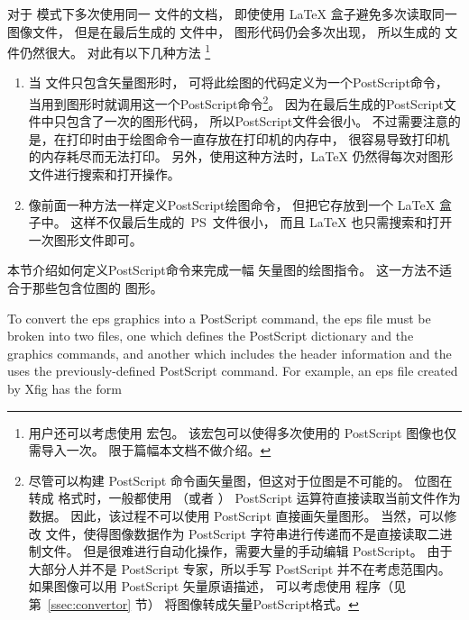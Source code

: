 对于  模式下多次使用同一  文件的文档，
即使使用 \LaTeX{} 盒子避免多次读取同一图像文件，
但是在最后生成的 文件中， 图形代码仍会多次出现，
所以生成的  文件仍然很大。
对此有以下几种方法 \footnote{
	用户还可以考虑使用  宏包。
	该宏包可以使得多次使用的 PostScript 图像也仅需导入一次。
	限于篇幅本文档不做介绍。}
\begin{enumerate}
	\item 当  文件只包含矢量图形时，
	可将此绘图的代码定义为一个PostScript命令，
	当用到图形时就调用这一个PostScript命令\footnote{
		尽管可以构建 PostScript 命令画矢量图，但这对于位图是不可能的。
		位图在转成  格式时，一般都使用  （或者 ） PostScript 运算符直接读取当前文件作为数据。
		因此，该过程不可以使用 PostScript 直接画矢量图形。
		当然，可以修改  文件，使得图像数据作为 PostScript 字符串进行传递而不是直接读取二进制文件。
		但是很难进行自动化操作，需要大量的手动编辑 PostScript。
		由于大部分人并不是 PostScript 专家，所以手写 PostScript 并不在考虑范围内。
		如果图像可以用 PostScript 矢量原语描述，
		可以考虑使用  程序（见第~\ref{ssec:convertor} 节） 将图像转成矢量PostScript格式。}。
	因为在最后生成的PostScript文件中只包含了一次的图形代码，
	所以PostScript文件会很小。
	不过需要注意的是，在打印时由于绘图命令一直存放在打印机的内存中，
	很容易导致打印机的内存耗尽而无法打印。
	另外，使用这种方法时，\LaTeX{} 仍然得每次对图形文件进行搜索和打开操作。
	\item 像前面一种方法一样定义PostScript绘图命令，
	但把它存放到一个 \LaTeX{} 盒子中。
	这样不仅最后生成的~PS~文件很小，
	而且 \LaTeX{} 也只需搜索和打开一次图形文件即可。
\end{enumerate}

本节介绍如何定义PostScript命令来完成一幅  矢量图的绘图指令。
这一方法不适合于那些包含位图的  图形。

To convert the eps graphics into a PostScript command, the eps file must be
broken into two files, one which defines the PostScript dictionary and the graphics
commands, and another which includes the header information and the uses the
previously-defined PostScript command. For example, an eps file created by Xfig
has the form

